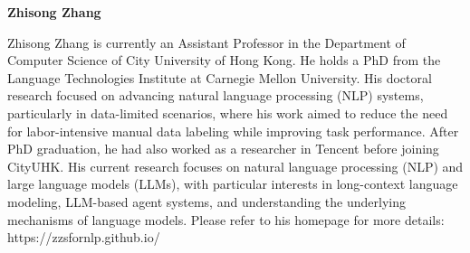 \vspace{\baselineskip}

\textbf{Zhisong Zhang}

Zhisong Zhang is currently an Assistant Professor in the Department of Computer Science of City University of Hong Kong. He holds a PhD from the Language Technologies Institute at Carnegie Mellon University. His doctoral research focused on advancing natural language processing (NLP) systems, particularly in data-limited scenarios, where his work aimed to reduce the need for labor-intensive manual data labeling while improving task performance. After PhD graduation, he had also worked as a researcher in Tencent before joining CityUHK. His current research focuses on natural language processing (NLP) and large language models (LLMs), with particular interests in long-context language modeling, LLM-based agent systems, and understanding the underlying mechanisms of language models. Please refer to his homepage for more details: https://zzsfornlp.github.io/

